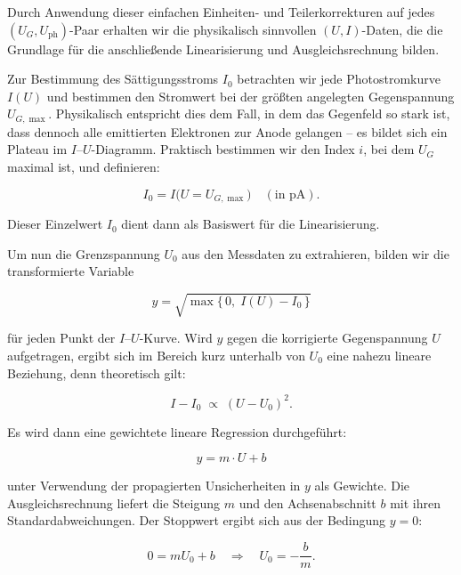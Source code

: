 Durch Anwendung dieser einfachen Einheiten- und Teilerkorrekturen auf jedes $(U_{G},U_{\mathrm{ph}})$-Paar erhalten wir die physikalisch sinnvollen $(U,I)$-Daten, die die Grundlage für die anschließende Linearisierung und Ausgleichsrechnung bilden.

Zur Bestimmung des Sättigungsstroms $I_{0}$ betrachten wir jede Photostromkurve $I(U)$ und bestimmen den Stromwert bei der größten angelegten Gegenspannung $U_{G,\max}$. Physikalisch entspricht dies dem Fall, in dem das Gegenfeld so stark ist, dass dennoch alle emittierten Elektronen zur Anode gelangen – es bildet sich ein Plateau im $I$–$U$-Diagramm. Praktisch bestimmen wir den Index $i$, bei dem $U_{G}$ maximal ist, und definieren:

\begin{equation}
  I_{0} = I\bigl(U = U_{G,\max}\bigr)\quad(\text{in pA}).
\end{equation}

Dieser Einzelwert $I_{0}$ dient dann als Basiswert für die Linearisierung.

Um nun die Grenzspannung $U_{0}$ aus den Messdaten zu extrahieren, bilden wir die transformierte Variable

\begin{equation}
  y = \sqrt{\max\{\,0,\;I(U) - I_{0}\,\}}
\end{equation}

für jeden Punkt der $I$–$U$-Kurve. Wird $y$ gegen die korrigierte Gegenspannung $U$ aufgetragen, ergibt sich im Bereich kurz unterhalb von $U_{0}$ eine nahezu lineare Beziehung, denn theoretisch gilt:

\begin{equation}
  I - I_{0} \;\propto\;(U - U_{0})^{2}.
\end{equation}

Es wird dann eine gewichtete lineare Regression durchgeführt:

\begin{equation}
    y = m \cdot U + b
\end{equation}

unter Verwendung der propagierten Unsicherheiten in $y$ als Gewichte. Die Ausgleichsrechnung liefert die Steigung $m$ und den Achsenabschnitt $b$ mit ihren Standardabweichungen. Der Stoppwert ergibt sich aus der Bedingung $y=0$:

\begin{equation}
  0 = m U_{0} + b
  \quad\Longrightarrow\quad
  U_{0} = -\frac{b}{m}.
\end{equation}

